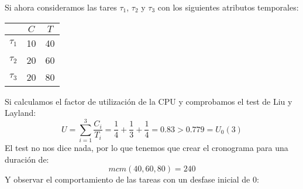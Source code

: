 \begin{ejemplo}
    Si ahora consideramos las tares $\tau_1$, $\tau_2$ y $\tau_3$ con los siguientes atributos temporales:
    \begin{table}[H]
    \centering
    \begin{tabular}{|c|c|c|}
        \hline
        & $C$ & $T$ \\
        \hline
        $\tau_1$ & 10 & 40 \\
        \hline
        $\tau_2$ & 20 & 60 \\
        \hline
        $\tau_3$ & 20 & 80 \\
        \hline
    \end{tabular}
    \end{table}
    \noindent
    Si calculamos el factor de utilización de la CPU y comprobamos el test de Liu y Layland:
    \begin{equation*}
        U = \sum_{i=1}^{3}\dfrac{C_i}{T_i} = \dfrac{1}{4} + \dfrac{1}{3} + \dfrac{1}{4} = 0.83 > 0.779 = U_0(3)
    \end{equation*}
    El test no nos dice nada, por lo que tenemos que crear el cronograma para una duración de:
    \begin{equation*}
        mcm(40,60,80) = 240
    \end{equation*}
    Y observar el comportamiento de las tareas con un desfase inicial de 0:
    \begin{figure}[H]
        \centering
\end{figure}
\end{ejemplo}
